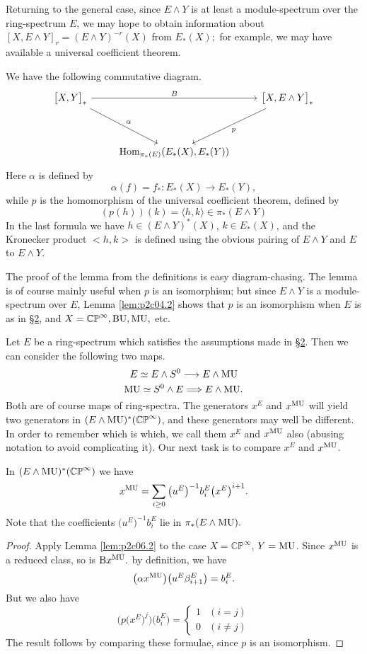 \documentclass[../main]{subfiles}
\begin{document}
Returning to the general case, since $E\wedge Y$ is at least a module-spectrum over the ring-spectrum $E$, we may hope to obtain information about $[X,E\wedge Y]_r=(E\wedge Y)^{-r}(X)$ from $E_\ast(X);$ for example, we may have available a universal coefficient theorem.

\begin{lemma}
\label{lem:p2c06.2}
We have the following commutative diagram.
\[\begin{tikzcd}
\bigl[X,Y\bigr]_\ast && \bigl[X,E\wedge Y\bigr]_\ast \\
\\
&\operatorname{Hom}_{\pi_\ast(E)}(E_\ast(X),E_\ast(Y))
\arrow["\alpha", from=1-1, to=3-2]
\arrow["B", from=1-1, to=1-3]
\arrow["p", from=1-3, to=3-2]
\end{tikzcd}\]
Here $\alpha$ is defined by 
\[\alpha(f)=f_\ast:E_\ast(X)\longrightarrow E_\ast(Y),\]
while $p$ is the homomorphism of the universal coefficient theorem, defined by 
\[(p(h))(k)=\langle h,k\rangle\in \pi_\ast(E\wedge Y)\]
In the last formula we have $h\in(E\wedge Y)^\ast(X)$, $k\in E_\ast(X)$, and the Kronecker product $<h,k>$ is defined using the obvious pairing of $E\wedge Y$ and $E$ to $E\wedge Y$.
\end{lemma}

The proof of the lemma from the definitions is easy diagram-chasing. The lemma is of course mainly useful when $p$ is an isomorphism; but since $E\wedge Y$ is a module-spectrum over $E$, Lemma \ref{lem:p2c04.2} shows that $p$ is an isomorphism when $E$ is as in \hyperref[sec:p2c2]{\S 2}, and $X=\mathbb{CP}^\infty, \mathrm{BU}, \mathrm{MU},$ etc.

Let $E$ be a ring-spectrum which satisfies the assumptions made in \hyperref[sec:p2c2]{\S 2}. Then we can consider the following two maps.
\[E\simeq E\wedge S^0\longrightarrow E\wedge \mathrm{MU}\]
\[\mathrm{MU}\simeq S^0\wedge E\Longrightarrow E\wedge \mathrm{MU}.\]
Both are of course maps of ring-spectra. The generators $x^E$ and $x^{\mathrm{MU}}$ will yield two generators in $(E\wedge \mathrm{MU})^\ast(\mathbb{CP}^\infty)$, and these generators may well be different. In order to remember which is which, we call them $x^E$ and $x^{\mathrm{MU}}$ also (abusing notation to avoid complicating it). Our next task is to compare $x^E$ and $x^{\mathrm{MU}}$.
\begin{lemma}
\label{lem:p2c06.3}
In $(E\wedge \mathrm{MU})^\ast(\mathbb{CP}^\infty)$ we have 
\[x^{\mathrm{MU}}=\sum_{i\geq 0}\big(u^E\big)^{-1}b_i^E\big(x^E\big)^{i+1}.\]
Note that the coefficients $\big(u^E\big)^{-1}b_i^E$ lie in $\pi_\ast(E\wedge \mathrm{MU}).$
\end{lemma}
\begin{proof}
Apply Lemma \ref{lem:p2c06.2} to the case $X=\mathbb{CP}^\infty$, $Y=\mathrm{MU}$. Since $x^{\mathrm{MU}}$ is a reduced class, so is $\mathrm{B}x^{\mathrm{MU}}.$ by definition, we have 
\[\big(\alpha x^{\mathrm{MU}}\big)\big(u^E\beta_{i+1}^E\big)=b_i^E.\]
But we also have 
\[\Big(p\big(x^E\big)^j\Big)\big(b_i^E\big)=\begin{cases}1 & (i=j) \\ 0 &(i\neq j)\end{cases}\]
The result follows by comparing these formulae, since $p$ is an isomorphism. 
\end{proof}
\end{document}
